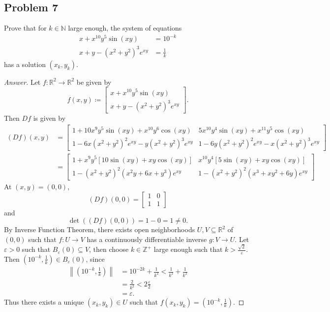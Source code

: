 \documentclass[12pt]{article}
\newcommand{\n}{\mathbb{N}}
\newcommand{\z}{\mathbb{Z}}
\newcommand{\real}{\mathbb{R}}
\newcommand\paren[1]{\left( #1 \right)}
\newcommand{\sqbrack}[1]{\left [ #1 \right ]}
\newcommand{\norm}[1]{\left\| #1 \right\|}
\newcommand{\eps}{\varepsilon}
\theoremstyle{definition}
\begin{document}
\subsection{Problem 7 \texorpdfstring{\cite{Lin}}{}}
Prove that for $k \in \n$ large enough, the system of equations
\begin{align*}
    x + x^{10} y^5 \sin \paren{ xy } & = 10^{-k} \\
    x + y - \paren{ x^2 + y^2 }^3 e^{xy} & = \frac{1}{k}
\end{align*}
has a solution $\paren{ x_k , y_k }$.
\begin{proof}[Answer]
    Let $f : \real^2 \to \real^2$ be given by 
    \[
        f(x,y) \coloneqq 
        \begin{bmatrix}
            x + x^{10} y^5 \sin \paren{ xy } \\
            x + y - \paren{ x^2 + y^2 }^3 e^{xy}
        \end{bmatrix}.
    \]
    Then $Df$ is given by 
    \begin{align*}
        (Df)(x,y) & = 
        \begin{bmatrix}
            1 + 10x^9y^5\sin(xy) + x^{10}y^6\cos(xy) & 5x^{10}y^4\sin(xy) + x^{11}y^5\cos(xy) \\
            1 - 6x\paren{x^2+y^2}^2e^{xy} - y\paren{x^2+y^2}^3e^{xy} & 1 - 6y\paren{x^2+y^2}^2e^{xy} - x\paren{x^2+y^2}^3e^{xy}
        \end{bmatrix} \\
        & = 
        \begin{bmatrix}
            1 + x^9 y^5 \sqbrack{ 10 \sin(xy) + xy \cos(xy) } & x^{10} y^4 \sqbrack{ 5 \sin(xy) + xy \cos(xy) } \\
            1 - \paren{ x^2 + y^2 }^2 \paren{ x^2y + 6x + y^3 } e^{xy} & 1 - \paren{ x^2 + y^2 }^2 \paren{ x^3 + xy^2 + 6y } e^{xy}
        \end{bmatrix}
    \end{align*}
    At $(x,y) = (0,0)$,
    \[
        (Df)(0,0) = 
        \begin{bmatrix}
            1 & 0 \\
            1 & 1
        \end{bmatrix}
    \]
    and 
    \[
        \det \paren{ (Df)(0,0) } = 1 - 0 = 1 \neq 0.
    \]
    By Inverse Function Theorem, there exists open neighborhoods $U , V \subseteq \real^2$ of $(0,0)$ such that $f : U \to V$ has a continuously differentiable inverse $g : V \to U$. Let $\eps > 0$ such that $B_{\eps}(0) \subseteq V$, then choose $k \in \z^+$ large enough such that $k > \frac{\sqrt{2}}{\eps}$. Then $\paren{ 10^{-k} , \frac{1}{k} } \in B_{\eps}(0)$, since \begin{align*}
        \norm{ \paren{ 10^{-k} , \frac{1}{k} } } & = 10^{-2k} + \frac{1}{k^2} < \frac{1}{k^2} + \frac{1}{k^2} \\
        & = \frac{2}{k^2} < 2\frac{\eps}{2} \\
        & = \eps.
    \end{align*}
    Thus there exists a unique $\paren{ x_k , y_k } \in U$ such that $f \paren{ x_k , y_k } = \paren{ 10^{-k} , \frac{1}{k} }$.
\end{proof}
\end{document}
